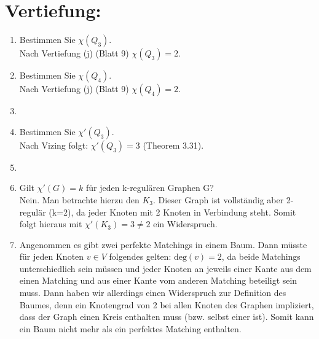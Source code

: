 

\usepackage{ tipa }
\usepackage{tikz}


    \maketitle
    \section*{Vertiefung:}
    \begin{enumerate}[label=(\alph*)]
        \item Bestimmen Sie $\chi(Q_3)$.\\
        Nach Vertiefung (j) (Blatt 9) $\chi (Q_3) = 2$. 
                
        \item Bestimmen Sie $\chi(Q_4)$.\\
        Nach Vertiefung (j) (Blatt 9) $\chi (Q_4) = 2$.        
                
        \item
               
        \item Bestimmen Sie $\chi'(Q_3)$.\\
        Nach Vizing folgt: $\chi'(Q_3) = 3$ (Theorem 3.31).
        
        \item
        
        \item Gilt $\chi ' (G) = k $ für jeden k-regulären Graphen G? \\
        Nein. Man betrachte hierzu den $K_3$. Dieser Graph ist vollständig aber 2-regulär (k=2), da jeder Knoten mit 2 Knoten in Verbindung steht. Somit folgt hieraus mit $\chi'(K_3) = 3 \neq 2$ ein Widerspruch.
        
        \item 
        Angenommen es gibt zwei perfekte Matchings in einem Baum. Dann müsste für jeden Knoten $v \in V$ folgendes gelten: $\textrm{deg}(v) = 2$, da beide Matchings unterschiedlich sein müssen und jeder Knoten an jeweils einer Kante aus dem einen Matching und aus einer Kante vom anderen Matching beteiligt sein muss. Dann haben wir allerdings einen Widerspruch zur Definition des Baumes, denn ein Knotengrad von 2 bei allen Knoten des Graphen impliziert, dass der Graph einen Kreis enthalten muss (bzw. selbst einer ist). Somit kann ein Baum nicht mehr als ein perfektes Matching enthalten. 
        

\end{enumerate}
